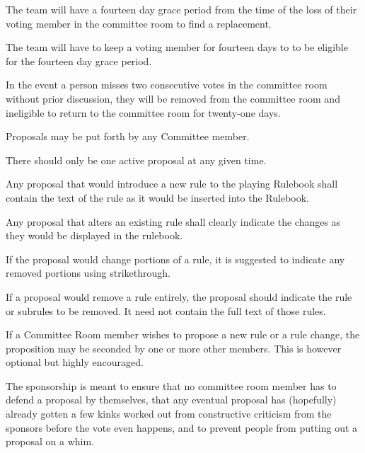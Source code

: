 \begin{deepEnumerate}
\begin{deepEnumerate}
        \item The team will have a fourteen day grace period from the time of the loss of their voting member in the committee room to find a replacement.
        \item The team will have to keep a voting member for fourteen days to to be eligible for the fourteen day grace period.
    \end{deepEnumerate}
    \item In the event a person misses two consecutive votes in the committee room without prior discussion, they will be removed from the committee room 
    and ineligible to return to the committee room for twenty-one days.
\end{deepEnumerate}

\begin{deepEnumerate}
    \item Proposals may be put forth by any Committee member.
    \item There should only be one active proposal at any given time.
    \item Any proposal that would introduce a new rule to the playing Rulebook shall contain the text of the rule as it would be inserted into the Rulebook.
    \item Any proposal that alters an existing rule shall clearly indicate the changes as they would be displayed in the rulebook.
    \begin{deepEnumerate}
        \item If the proposal would change portions of a rule, it is suggested to indicate any removed portions using strikethrough.
    \end{deepEnumerate}
    \item If a proposal would remove a rule entirely, the proposal should indicate the rule or subrules to be removed. It need not contain the full text of those rules.
    \item If a Committee Room member wishes to propose a new rule or a rule change, the proposition may be seconded by one or more other members.
    This is however optional but highly encouraged.
    \begin{deepEnumerate}
        \item The sponsorship is meant to ensure that no committee room member has to defend a proposal by themselves, that any eventual proposal has (hopefully) already gotten 
        a few kinks worked out from constructive criticism from the sponsors before the vote even happens, and to prevent people from putting out a proposal on a whim.

\end{deepEnumerate}
\end{deepEnumerate}
